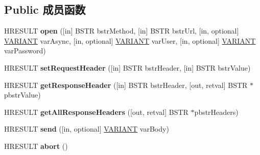 \subsection*{Public 成员函数}
\begin{DoxyCompactItemize}
\item 
\mbox{\label{interface_i_x_m_l_http_request_a40875e7fe858c371a52f50e788cae9c2}} 
H\+R\+E\+S\+U\+LT {\bfseries open} (\mbox{[}in\mbox{]} B\+S\+TR bstr\+Method, \mbox{[}in\mbox{]} B\+S\+TR bstr\+Url, \mbox{[}in, optional\mbox{]} \hyperlink{structtag_v_a_r_i_a_n_t}{V\+A\+R\+I\+A\+NT} var\+Async, \mbox{[}in, optional\mbox{]} \hyperlink{structtag_v_a_r_i_a_n_t}{V\+A\+R\+I\+A\+NT} var\+User, \mbox{[}in, optional\mbox{]} \hyperlink{structtag_v_a_r_i_a_n_t}{V\+A\+R\+I\+A\+NT} var\+Password)
\item 
\mbox{\label{interface_i_x_m_l_http_request_a972909618e68621ce29d6d9fc9faf28e}} 
H\+R\+E\+S\+U\+LT {\bfseries set\+Request\+Header} (\mbox{[}in\mbox{]} B\+S\+TR bstr\+Header, \mbox{[}in\mbox{]} B\+S\+TR bstr\+Value)
\item 
\mbox{\label{interface_i_x_m_l_http_request_af62f767e66538155d47097ec8bba03e8}} 
H\+R\+E\+S\+U\+LT {\bfseries get\+Response\+Header} (\mbox{[}in\mbox{]} B\+S\+TR bstr\+Header, \mbox{[}out, retval\mbox{]} B\+S\+TR $\ast$pbstr\+Value)
\item 
\mbox{\label{interface_i_x_m_l_http_request_a30d48ed758e8751a15836fa4535a18a0}} 
H\+R\+E\+S\+U\+LT {\bfseries get\+All\+Response\+Headers} (\mbox{[}out, retval\mbox{]} B\+S\+TR $\ast$pbstr\+Headers)
\item 
\mbox{\label{interface_i_x_m_l_http_request_a02c6f75593e4eb93cccb15359313ef63}} 
H\+R\+E\+S\+U\+LT {\bfseries send} (\mbox{[}in, optional\mbox{]} \hyperlink{structtag_v_a_r_i_a_n_t}{V\+A\+R\+I\+A\+NT} var\+Body)
\item 
\mbox{\label{interface_i_x_m_l_http_request_a8ba43aa24bc18f89ca429c380db8c9dd}} 
H\+R\+E\+S\+U\+LT {\bfseries abort} ()
\end{DoxyCompactItemize}
